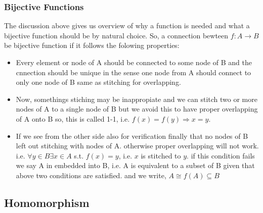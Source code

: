 \documentclass{article}
\begin{document}
\subsubsection{Bijective Functions}
The discussion above gives us overview of why a function is needed and what a bijective function should be by natural choice.
So, a connection bewteen $f:A\rightarrow B$ be bijective function if it follows the folowing properties:
\begin{itemize}
    \item Every element or node of A should be connected to some node of B and the cnnection should be unique in the sense one node from A should connect to only one node of B same as stitching for overlapping.
    \item Now, somethings stiching may be inappropiate and we can stitch two or more nodes of A to a single node of B but we avoid this to have proper overlapping of A onto B so, this is called 1-1, i.e. $f(x)=f(y)\Rightarrow x=y$.
    \item If we see from the other side also for verification finally that no nodes of B left out stitching with nodes of A. otherwise proper overlapping will not work. i.e. $\forall y \in B \exists x\in A$ s.t. $f(x)=y$, i.e. $x$ is stitched to $y$. 
    if this condition fails we say A in embedded into B, i.e. A is equivalent to a subset of B given that above two conditions are satisfied.
    and we write, $A\cong f(A)\subseteq B$

    \begin{center}
\end{center}
\end{itemize}

\subsection{Homomorphism}
\end{document}

